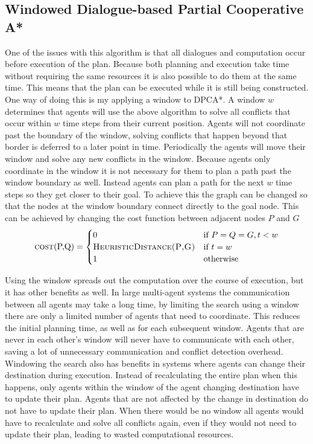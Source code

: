 \subsection{Windowed Dialogue-based Partial Cooperative A*}
One of the issues with this algorithm is that all dialogues and computation
occur before execution of the plan. Because both planning and execution take
time without requiring the same resources it is also possible to do them at the
same time. This means that the plan can be executed while it is still being
constructed. One way of doing this is my applying a window to DPCA*. A
window $w$ determines that agents will use the above algorithm to solve all
conflicts that occur within $w$ time steps from their current position. Agents
will not coordinate past the boundary of the window, solving conflicts that
happen beyond that border is deferred to a later point in time. Periodically
the agents will move their window and solve any new conflicts in the window.
Because agents only coordinate in the window it is not necessary for them to
plan a path past the window boundary as well. Instead agents can plan a path
for the next $w$ time steps so they get closer to their goal. To achieve this
the graph can be changed so that the nodes at the window boundary connect
directly to the goal node. This can be achieved by changing the cost function
between adjacent nodes $P$ and $G$ \cite{silver2005}
\[
\text{\textsc{cost}(P,Q)} =
\begin{cases}
    0 & \text{if } P = Q = G, t < w \\
    \textsc{HeuristicDistance(P,G)} & \text{if } t = w \\
    1 & \text{otherwise}
\end{cases}
\]

Using the window spreads out the computation over the course of execution, but
it has other benefits as well. In large multi-agent systems the communication
between all agents may take a long time, by limiting the search using a window
there are only a limited number of agents that need to coordinate. This reduces
the initial planning time, as well as for each subsequent window. Agents that
are never in each other's window will never have to communicate with each other,
saving a lot of unnecessary communication and conflict detection overhead.
Windowing the search also has benefits in systems where agents can change their
destination during execution. Instead of recalculating the entire plan when
this happens, only agents within the window of the agent changing destination
have to update their plan. Agents that are not affected by the change in
destination do not have to update their plan. When there would be no window all
agents would have to recalculate and solve all conflicts again, even if they
would not need to update their plan, leading to wasted computational resources.

